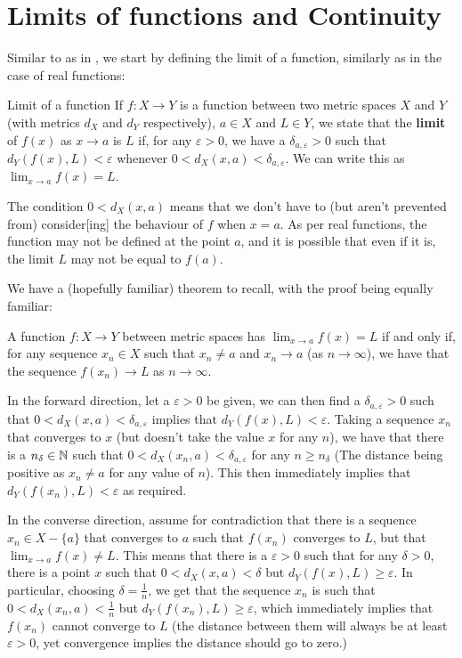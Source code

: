 \section{Limits of functions and Continuity}

Similar to as in \cite{rudin}, we start by defining the limit of a function, similarly as in the case of real functions:

\begin{bdefin}{Limit of a function}{}
If $f : X \to Y$ is a function between two metric spaces $X$ and $Y$ (with metrics $d_{X}$ and $d_{Y}$ respectively), $a \in X$ and $L \in Y$, we state that the \textbf{limit} of $f(x)$ as $x\to a$ is $L$ if, for any $\varepsilon > 0$, we have a $\delta_{a,\varepsilon} > 0$ such that $d_{Y}(f(x), L) < \varepsilon$ whenever $0 < d_{X}(x,a) < \delta_{a, \varepsilon} $. We can write this as $\lim_{x \to a} f(x) = L$.
\end{bdefin}

The condition $0 < d_{X}(x,a)$ means that we don't have to (but aren't prevented from) consider[ing] the behaviour of $f$ when $x=a$. As per real functions, the function may not be defined at the point $a$, and it is possible that even if it is, the limit $L$ may not be equal to $f(a)$.

We have a (hopefully familiar) theorem to recall, with the proof being equally familiar:
\begin{bprop}{}{}
A function $f : X \to Y$ between metric spaces has $\lim_{x \to a} f(x) = L$ if and only if, for any sequence $x_{n} \in X$ such that $x_{n} \neq a$ and $x_{n} \to a$ (as $n\to\infty$), we have that the sequence $f(x_{n}) \to L$ as $n\to\infty$.
\end{bprop}

\begin{bproof}{}{}
In the forward direction, let a $\varepsilon>0$ be given, we can then find a $\delta_{a,\varepsilon} > 0$ such that $0 < d_{X}(x,a) < \delta_{a, \varepsilon}$ implies that $d_{Y}(f(x), L) < \varepsilon$. Taking a sequence $x_{n}$ that converges to $x$ (but doesn't take the value $x$ for any $n$), we have that there is a $n_{\delta} \in \mathbb{N}$ such that $0 < d_{X}(x_{n},a) < \delta_{a, \varepsilon}$ for any $n\geq n_{\delta}$ (The distance being positive as $x_{n} \neq a$ for any value of $n$). This then immediately implies that $d_{Y}(f(x_{n}), L) < \varepsilon$ as required.

In the converse direction, assume for contradiction that there is a sequence $x_{n} \in X - \{a\}$ that converges to $a$ such that $f(x_{n})$ converges to $L$, but that $\lim_{x \to a} f(x) \neq L$. This means that there is a $\varepsilon > 0$ such that for any $\delta > 0$, there is a point $x$ such that $0 < d_{X}(x,a) < \delta$ but $d_{Y}(f(x),L) \geq \varepsilon$. In particular, choosing $\delta = \frac{1}{n}$, we get that the sequence $x_{n}$ is such that $0 < d_{X}(x_{n},a) < \frac{1}{n}$ but $d_{Y}(f(x_{n}),L) \geq \varepsilon$, which immediately implies that $f(x_{n})$ cannot converge to $L$ (the distance between them will always be at least $\varepsilon > 0$, yet convergence implies the distance should go to zero.)
\eop
\end{bproof}

